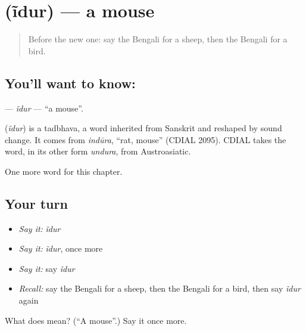 \section[\texorpdfstring{\bn{ইঁদুর} (ĩdur)}{ইঁদুর (ĩdur)}]{ (ĩdur) — a mouse}

\label{lesson:BN-C69-idur}



\begin{quote}
Before the new one: say the Bengali for a sheep, then the Bengali for a bird.
\end{quote}

\subsection*{You'll want to know: }
\textbf{} — \emph{ĩdur} — \textquotedblleft{}a mouse\textquotedblright{}.

\begin{cousinweb}
\textbf{} (\emph{ĩdur}) is a tadbhava, a word inherited from Sanskrit and reshaped by sound change. It comes from \emph{indūra}, \textquotedblleft{}rat, mouse\textquotedblright{} (CDIAL 2095). CDIAL takes the word, in its other form \emph{undura}, from Austroasiatic.
\end{cousinweb}

\begin{grammarlens}[title={What you've built}]
One more word for this chapter.
\end{grammarlens}

\subsection*{Your turn}
\begin{itemize}
\raggedright
  \item \emph{Say it:} \emph{ĩdur}
  \item \emph{Say it:} \emph{ĩdur}, once more
  \item \emph{Say it:} say \emph{ĩdur}
  \item \emph{Recall:} say the Bengali for a sheep, then the Bengali for a bird, then say \emph{ĩdur} again
\end{itemize}

\begin{tcolorbox}[breakable,colback=teal!4,colframe=teal!35!black,title={Before you move on}]
What does  mean? (\textquotedblleft{}A mouse\textquotedblright{}.) Say it once more.
\end{tcolorbox}
